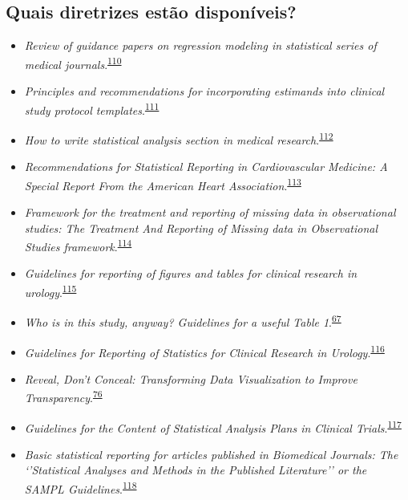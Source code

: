 \documentclass[
]{book}
\begin{document}
\hypertarget{quais-diretrizes-estuxe3o-disponuxedveis}{%
\subsection{Quais diretrizes estão disponíveis?}\label{quais-diretrizes-estuxe3o-disponuxedveis}}

\begin{itemize}
\item
  \emph{Review of guidance papers on regression modeling in statistical series of medical journals}.\textsuperscript{\protect\hyperlink{ref-Wallisch2022}{110}}
\item
  \emph{Principles and recommendations for incorporating estimands into clinical study protocol templates}.\textsuperscript{\protect\hyperlink{ref-Lynggaard2022}{111}}
\item
  \emph{How to write statistical analysis section in medical research}.\textsuperscript{\protect\hyperlink{ref-Dwivedi2022}{112}}
\item
  \emph{Recommendations for Statistical Reporting in Cardiovascular Medicine: A Special Report From the American Heart Association}.\textsuperscript{\protect\hyperlink{ref-Althouse2021}{113}}
\item
  \emph{Framework for the treatment and reporting of missing data in observational studies: The Treatment And Reporting of Missing data in Observational Studies framework}.\textsuperscript{\protect\hyperlink{ref-Lee2021}{114}}
\item
  \emph{Guidelines for reporting of figures and tables for clinical research in urology}.\textsuperscript{\protect\hyperlink{ref-Vickers2020}{115}}
\item
  \emph{Who is in this study, anyway? Guidelines for a useful Table 1}.\textsuperscript{\protect\hyperlink{ref-Hayes-Larson2019}{67}}
\item
  \emph{Guidelines for Reporting of Statistics for Clinical Research in Urology}.\textsuperscript{\protect\hyperlink{ref-assel2019}{116}}
\item
  \emph{Reveal, Don't Conceal: Transforming Data Visualization to Improve Transparency}.\textsuperscript{\protect\hyperlink{ref-Weissgerber2019}{76}}
\item
  \emph{Guidelines for the Content of Statistical Analysis Plans in Clinical Trials}.\textsuperscript{\protect\hyperlink{ref-Gamble2017}{117}}
\item
  \emph{Basic statistical reporting for articles published in Biomedical Journals: The `'Statistical Analyses and Methods in the Published Literature'' or the SAMPL Guidelines}.\textsuperscript{\protect\hyperlink{ref-Lang2015}{118}}

\end{itemize}
\end{document}
